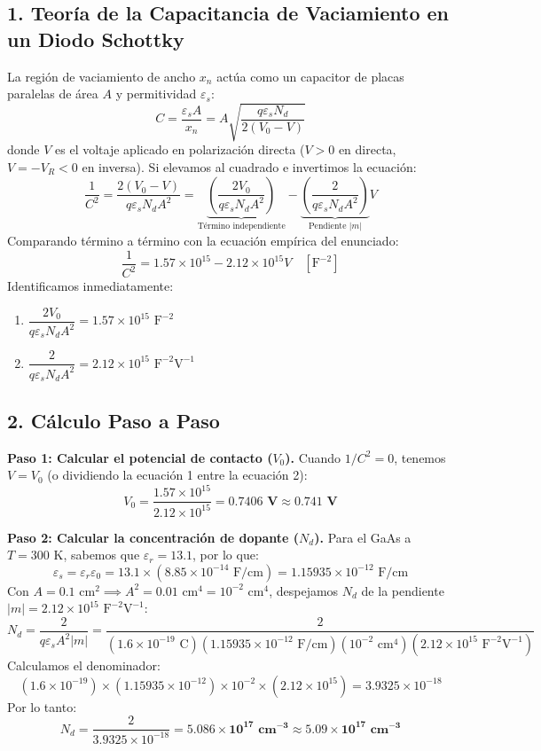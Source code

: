 \documentclass[11pt,a4paper]{article}
\begin{document}
\subsection*{1. Teoría de la Capacitancia de Vaciamiento en un Diodo Schottky}
La región de vaciamiento de ancho $x_n$ actúa como un capacitor de placas paralelas de área $A$ y permitividad $\varepsilon_s$:
\[
C = \frac{\varepsilon_s A}{x_n} = A \sqrt{\frac{q \varepsilon_s N_d}{2(V_0 - V)}}
\]
donde $V$ es el voltaje aplicado en polarización directa ($V > 0$ en directa, $V = -V_R < 0$ en inversa). Si elevamos al cuadrado e invertimos la ecuación:
\[
\frac{1}{C^2} = \frac{2(V_0 - V)}{q \varepsilon_s N_d A^2} = \underbrace{\left(\frac{2 V_0}{q \varepsilon_s N_d A^2}\right)}_{\text{Término independiente}} - \underbrace{\left(\frac{2}{q \varepsilon_s N_d A^2}\right)}_{\text{Pendiente } |m|} V
\]
Comparando término a término con la ecuación empírica del enunciado:
\[
\frac{1}{C^2} = 1.57 \times 10^{15} - 2.12 \times 10^{15} V \quad [\text{F}^{-2}]
\]
Identificamos inmediatamente:
\begin{enumerate}
    \item $\dfrac{2 V_0}{q \varepsilon_s N_d A^2} = 1.57 \times 10^{15}\text{ F}^{-2}$
    \item $\dfrac{2}{q \varepsilon_s N_d A^2} = 2.12 \times 10^{15}\text{ F}^{-2}\text{V}^{-1}$
\end{enumerate}

\subsection*{2. Cálculo Paso a Paso}
\textbf{Paso 1: Calcular el potencial de contacto ($V_0$).}
Cuando $1/C^2 = 0$, tenemos $V = V_0$ (o dividiendo la ecuación 1 entre la ecuación 2):
\[
V_0 = \frac{1.57 \times 10^{15}}{2.12 \times 10^{15}} = \mathbf{0.7406\text{ V} \approx 0.741\text{ V}}
\]

\textbf{Paso 2: Calcular la concentración de dopante ($N_d$).}
Para el GaAs a $T = 300\text{ K}$, sabemos que $\varepsilon_r = 13.1$, por lo que:
\[
\varepsilon_s = \varepsilon_r \varepsilon_0 = 13.1 \times (8.85 \times 10^{-14}\text{ F/cm}) = 1.15935 \times 10^{-12}\text{ F/cm}
\]
Con $A = 0.1\text{ cm}^2 \implies A^2 = 0.01\text{ cm}^4 = 10^{-2}\text{ cm}^4$, despejamos $N_d$ de la pendiente $|m| = 2.12 \times 10^{15}\text{ F}^{-2}\text{V}^{-1}$:
\[
N_d = \frac{2}{q \varepsilon_s A^2 |m|} = \frac{2}{(1.6 \times 10^{-19}\text{ C})(1.15935 \times 10^{-12}\text{ F/cm})(10^{-2}\text{ cm}^4)(2.12 \times 10^{15}\text{ F}^{-2}\text{V}^{-1})}
\]
Calculamos el denominador:
\[
(1.6 \times 10^{-19}) \times (1.15935 \times 10^{-12}) \times 10^{-2} \times (2.12 \times 10^{15}) = 3.9325 \times 10^{-18}
\]
Por lo tanto:
\[
N_d = \frac{2}{3.9325 \times 10^{-18}} = \mathbf{5.086 \times 10^{17}\text{ cm}^{-3} \approx 5.09 \times 10^{17}\text{ cm}^{-3}}
\]
\end{document}
